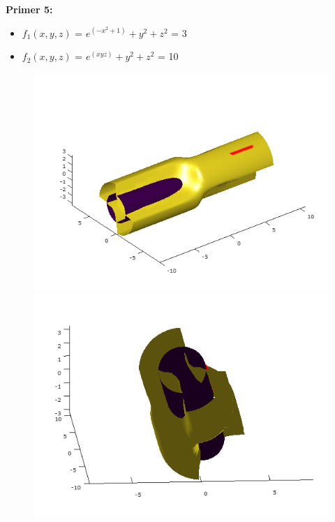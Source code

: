 \documentclass[12pt]{article}
\begin{document}
	\begin{minipage}{\textwidth}
		\textbf{\large{Primer 5:}}
		\begin{itemize}  
			\item $f_{1}(x,y,z)$ = $e^{(-x^{2}+1)}+y^{2}+z^{2}$ = 3
			\item $f_{2}(x,y,z)$ = $e^{(xyz)}+y^{2}+z^{2}$ = 10
		\end{itemize}
		\begin{figure}[H]
			\centering
			\includegraphics[scale=0.47]{primer5_1}
			\includegraphics[scale=0.47]{primer5_2} 

\end{figure}
\end{minipage}
\end{document}
